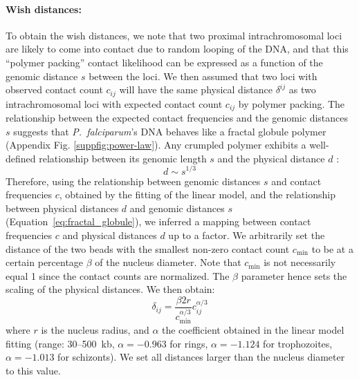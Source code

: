 \paragraph{Wish distances: }

To obtain the wish distances, we note that two proximal intrachromosomal loci
are likely to come into contact due to random looping of the DNA, and that
this ``polymer packing'' contact likelihood can be expressed as a function of
the genomic distance $s$ between the loci. We then assumed that two loci with
observed contact count $c_{ij}$ will have the same physical distance
$\delta^{ij}$ as two intrachromosomal loci with expected contact count
$c_{ij}$ by polymer packing. The relationship between the expected contact
frequencies and the genomic distances $s$ suggests that \textit{P.\
falciparum}'s DNA behaves like a fractal globule polymer
\citep{lieberman-aiden:comprehensive} (Appendix Fig.
\ref{suppfig:power-law}). Any crumpled polymer exhibits a well-defined
relationship between its genomic length $s$ and the physical distance $d$
\citep{grosberg:role}:
\begin{equation}
d \sim s^{1 / 3}
\label{eq:fractal_globule}
\end{equation}
Therefore, using the relationship between genomic distances $s$ and
contact frequencies $c$, obtained by the fitting of the linear
model, and the relationship between physical distances $d$ and genomic
distances $s$ (Equation~\ref{eq:fractal_globule}), we inferred a
mapping between contact frequencies $c$ and physical distances $d$
up to a factor. We arbitrarily set the distance of the two beads with
the smallest non-zero contact count $c_\text{min}$ to be at a
certain percentage $\beta$ of the nucleus diameter. Note that
$c_\text{min}$ is not necessarily equal 1 since the contact counts are
normalized. The $\beta$ parameter hence sets the scaling of the physical
distances. We then obtain:
\begin{equation}
\delta_{ij} = \frac{\beta 2 r}{c_\text{min}^{\alpha / 3}} c_{ij}^{\alpha / 3}
\end{equation}
where $r$ is the nucleus radius, and $\alpha$ the coefficient obtained
in the linear model fitting (range: 30--500~kb, $\alpha=-0.963$ for rings,
$\alpha = -1.124$ for trophozoites, $\alpha = -1.013$ for schizonts).
We set all distances larger than the nucleus diameter to this value.

